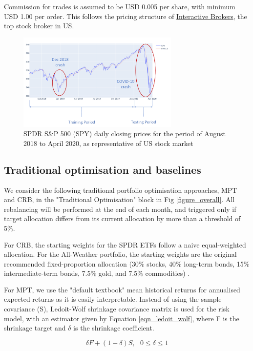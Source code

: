 \documentclass{article}
\begin{document}
Commission for trades is assumed to be USD 0.005 per share, with minimum USD 1.00 per order. This follows the pricing structure of \href{https://www1.interactivebrokers.com/en/index.php?f=1590&p=stocks}{Interactive Brokers}, the top stock broker in US.

\begin{figure}[tbh]
    \includegraphics[width=8cm]{figure_SPY.png}
    \caption{SPDR S\&P 500 (SPY) daily closing prices for the period of August 2018 to April 2020, as representative of US stock market  \label{figure_SPY}}
\end{figure}




\subsection{Traditional optimisation and baselines}
We consider the following traditional portfolio optimisation approaches, MPT and CRB, in the "Traditional Optimisation" block in Fig \ref{figure_overall}. All rebalancing will be performed at the end of each month, and triggered only if target allocation differs from its current allocation by more than a threshold of 5\%.

For CRB, the starting weights for the SPDR ETFs follow a naive equal-weighted allocation. For the All-Weather portfolio, the starting weights are the original recommended fixed-proportion allocation (30\% stocks, 40\% long-term bonds, 15\% intermediate-term bonds, 7.5\% gold, and 7.5\% commodities) \cite{robbins_2016}.

For MPT, we use the "default textbook" mean historical returns for annualised expected returns as it is easily interpretable. Instead of using the sample covariance (S), Ledoit-Wolf shrinkage covariance matrix \cite{Ledoit2004} is used for the risk model, with an estimator given by Equation \ref{eqn_ledoit_wolf}, where F is the shrinkage target and $\delta$ is the shrinkage coefficient.

\begin{equation}
\delta F + (1-\delta)S,\ \ \ 0 \leqslant \delta \leqslant 1 \label{eqn_ledoit_wolf}
\end{equation}
\end{document}
